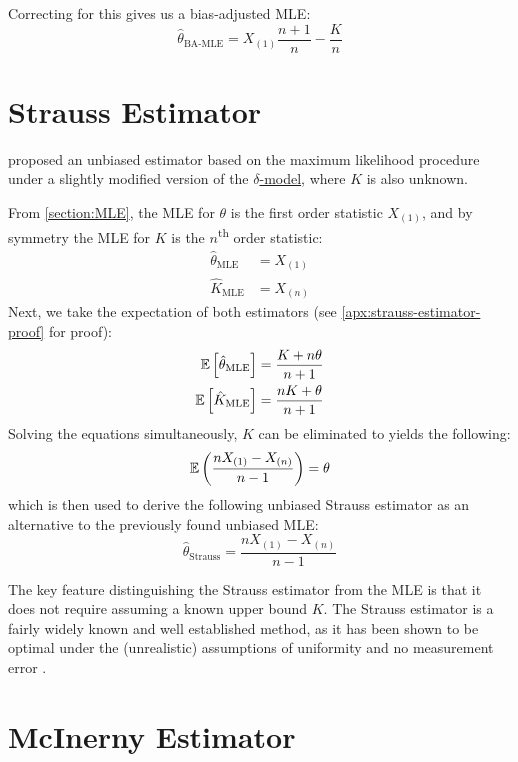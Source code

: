 Correcting for this gives us a bias-adjusted MLE:
\begin{equation}\label{eq:ba-mle}
    \hat\theta_{\text{BA-MLE}} = X_{(1)} \frac{n+1}{n} - \frac{K}{n}
\end{equation}

\section{Strauss Estimator}

\citet{Strauss1989} proposed an unbiased estimator based on the maximum likelihood procedure under a slightly modified version of the \hyperref[model: no-measurement-error]{$\delta$-model}, where $K$ is also unknown.

From \autoref{section:MLE}, the MLE for $\theta$ is the first order statistic $X_{(1)}$, and by symmetry the MLE for $K$ is the $n$\textsuperscript{th} order statistic:
\begin{align*}
    \hat\theta_{\text{MLE}} &= X_{(1)} \\
    \hat K_{\text{MLE}} &= X_{(n)}
\end{align*}
Next, we take the expectation of both estimators (see \autoref{apx:strauss-estimator-proof} for proof):
\begin{align*}
    \mathbb{E} \left[ \hat\theta_{\text{MLE}} \right] &= \frac{K + n\theta}{n+1} \\
    \mathbb{E} \left[ \hat K_{\text{MLE}} \right]  &= \frac{nK + \theta}{n+1}
\end{align*}
Solving the equations simultaneously, $K$ can be eliminated to yields the following:
\[
\mathbb{E} \left( \frac{nX_{(1)} - X_{(n)}}{n-1} \right) = \theta
\]
which is then used to derive the following unbiased Strauss estimator as an alternative to the previously found unbiased MLE:
\begin{equation}\label{eq:strauss}
\hat\theta_{\text{Strauss}} = \frac{n X_{(1)} - X_{(n)}}{n-1}
\end{equation}

The key feature distinguishing the Strauss estimator from the MLE is that it does not require assuming a known upper bound $K$. The Strauss estimator is a fairly widely known and well established method, as it has been shown to be optimal under the (unrealistic) assumptions of uniformity and no measurement error \cite{wang_chudzicki_everson_2009}.

\section{McInerny Estimator}

